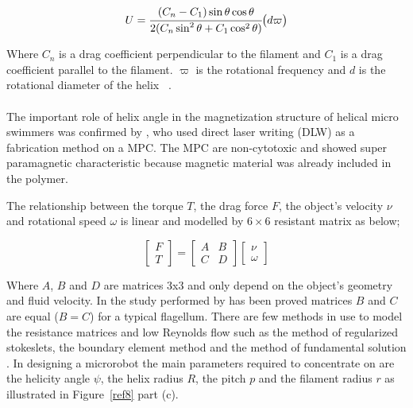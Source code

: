 \documentclass[12pt,a4paper,titlepage]{report}
\begin{document}
\begin{equation}
  U = {\cfrac{(C_n - C_1) \sin \theta \cos \theta}{2(C_n \sin^2 \theta + C_1 \cos^2 \theta)}} \big( d \varpi \big)
\end{equation} 

Where $C_n$ is a drag coefficient perpendicular to the filament and $C_1$ is a drag coefficient
 parallel to the filament. $ \varpi$ is the rotational frequency and $d$ is the rotational diameter of 
the helix ~\citep{tottori2012magnetic}.  



\paragraph{}
The important role of helix angle in the magnetization structure of helical micro swimmers 
was confirmed by \citeauthor{peyer2013bacteria} \citep{peyer2013bacteria}, who used direct laser writing (DLW) as a fabrication method 
 on a \ac*{MPC}. The \ac*{MPC} are non-cytotoxic and showed 
super paramagnetic characteristic because magnetic material was already included in the polymer. 

The relationship between the torque $T$, the drag force $F$, the object\rq{}s velocity $\nu$ and rotational 
speed $\omega$ is linear and modelled by $6\times6$ resistant matrix as below;



\[
\begin{bmatrix} F\\ 
T \end{bmatrix}  =\begin{bmatrix} A & B \\ 
C & D \end{bmatrix}  \begin{bmatrix} \nu
 \\ \omega
\end{bmatrix}
\]




Where $A$, $B$ and $D$ are matrices 3x3 and only depend on the object\rq{}s geometry and fluid velocity.
In the study performed by \citeauthor{purcell1997efficiency} \citep{purcell1997efficiency} has been proved 
matrices $B$ and $C$ are equal ($B = C$) for a typical flagellum. 
There are few methods in use to model the resistance matrices and low Reynolds flow such as the 
method of regularized stokeslets, the boundary element method and the method of fundamental solution
. In designing a microrobot the main parameters required to concentrate on are the helicity angle $\psi$, 
the helix radius $R$, the pitch $p$ and the filament radius $r$ as illustrated in Figure~\ref{ref8} part (c). 
\end{document}
